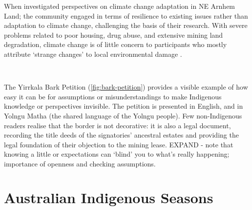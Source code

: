 
When \citet{petheram2010} investigated perspectives on climate change
adaptation in NE Arnhem Land; the community engaged in terms of resilience to
existing issues rather than adaptation to climate change, challenging the basis
of their research.  With severe problems related to poor housing, drug abuse,
and extensive mining land degradation, climate change is of little concern to
participants who mostly attribute `strange changes' to local environmental
damage \citep{green2010a}.

~\\


The Yirrkala Bark Petition (\cref{fig:bark-petition}) provides a visible
example of how easy it can be for assumptions or misunderstandings to make
Indigenous knowledge or perspectives invisible.  The petition is presented
in English, and in Yolngu Matha (the shared language of the Yolngu people).
Few non-Indigenous readers realise that the border is not decorative: it is
also a legal document, recording the title deeds of the signatories' ancestral
estates and providing the legal foundation of their objection to the mining
lease.
%
EXPAND - note that knowing a little or expectations can `blind' you to
what's really happening; importance of openness and checking assumptions.



\section{Australian Indigenous Seasons}
\label{sec:aus-indig-seasons}


